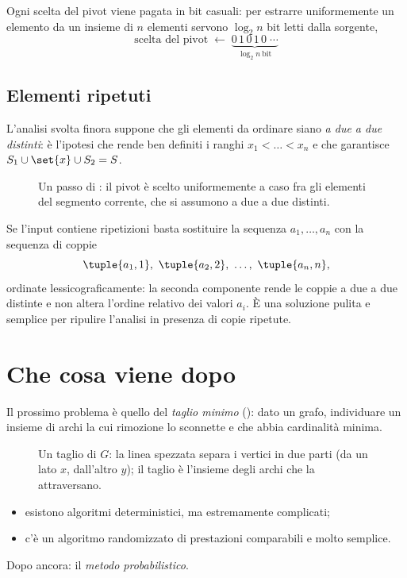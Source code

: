 \begin{osservazione}
Ogni scelta del pivot viene pagata in bit casuali: per estrarre uniformemente un
elemento da un insieme di $n$ elementi servono $\log_2 n$ bit letti dalla
sorgente,
\[
  \text{scelta del pivot}\;\longleftarrow\;
  \underbrace{0\,1\,0\,1\,0\;\cdots}_{\log_2 n\ \text{bit}}
\]
\end{osservazione}

\subsection{Elementi ripetuti}
\label{sec:randqs-ripetuti}

L'analisi svolta finora suppone che gli elementi da ordinare siano \emph{a due a
due distinti}: è l'ipotesi che rende ben definiti i ranghi $x_1<\dots<x_n$ e che
garantisce $S_1\cup\set{x}\cup S_2 = S$.

\begin{figure}[H]
  \centering
  
  \caption{Un passo di \RandQS: il pivot è scelto uniformemente a caso fra gli
  elementi del segmento corrente, che si assumono a due a due distinti.}
  \label{fig:randqs-pivot-array}
\end{figure}

Se l'input contiene ripetizioni basta sostituire la sequenza $a_1,\dots,a_n$ con
la sequenza di coppie
\[
  \tuple{a_1,1},\ \tuple{a_2,2},\ \dots,\ \tuple{a_n,n},
\]
ordinate lessicograficamente: la seconda componente rende le coppie a due a due
distinte e non altera l'ordine relativo dei valori $a_i$. È una soluzione pulita
e semplice per ripulire l'analisi in presenza di copie ripetute.

\section{Che cosa viene dopo}
\label{sec:randqs-seguito}

Il prossimo problema è quello del \emph{taglio minimo} (\mincut): dato un grafo,
individuare un insieme di archi la cui rimozione lo sconnette e che abbia
cardinalità minima.

\begin{figure}[H]
  \centering
  
  \caption{Un taglio di $G$: la linea spezzata separa i vertici in due parti (da
  un lato $x$, dall'altro $y$); il taglio è l'insieme degli archi che la
  attraversano.}
  \label{fig:mincut-anticipazione}
\end{figure}

\begin{itemize}
  \item esistono algoritmi deterministici, ma estremamente complicati;
  \item c'è un algoritmo randomizzato di prestazioni comparabili e molto
        semplice.
\end{itemize}

Dopo ancora: il \emph{metodo probabilistico}.
